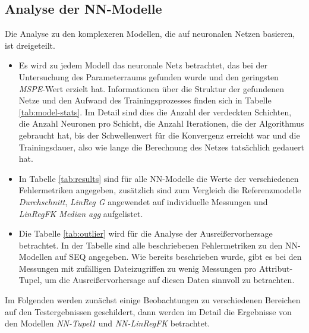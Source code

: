 \documentclass[
	12pt,
	a4paper,
	BCOR10mm,
	DIV14,
	listof=totoc,
	bibliography=totoc,
	headsepline
]{scrreprt}
\begin{document}
\subsection{Analyse der NN-Modelle}
Die Analyse zu den komplexeren Modellen, die auf neuronalen Netzen basieren, ist dreigeteilt. 
\begin{itemize}
	\item Es wird zu jedem Modell das neuronale Netz betrachtet, das bei der Untersuchung des Parameterraums gefunden wurde und den geringsten \textit{MSPE}-Wert erzielt hat.
Informationen über die Struktur der gefundenen Netze und den Aufwand des Trainingsprozesses finden sich in Tabelle \ref{tab:model-stats}. Im Detail sind dies die Anzahl der verdeckten Schichten, die Anzahl Neuronen pro Schicht, die Anzahl Iterationen, die der Algorithmus gebraucht hat, bis der Schwellenwert für die Konvergenz erreicht war und die Trainingsdauer, also wie lange die Berechnung des Netzes tatsächlich gedauert hat.
	\item In Tabelle \ref{tab:results} sind für alle NN-Modelle die Werte der verschiedenen Fehlermetriken angegeben, zusätzlich sind zum Vergleich die Referenzmodelle \textit{Durchschnitt}, \textit{LinReg G} angewendet auf individuelle Messungen und \textit{LinRegFK Median agg} aufgelistet.
	\item Die Tabelle \ref{tab:outlier} wird für die Analyse der Ausreißervorhersage betrachtet. In der Tabelle sind alle beschriebenen Fehlermetriken zu den NN-Modellen auf SEQ angegeben. Wie bereits beschrieben wurde, gibt es bei den Messungen mit zufälligen Dateizugriffen zu wenig Messungen pro Attribut-Tupel, um die Ausreißervorhersage auf diesen Daten sinnvoll zu betrachten.
\end{itemize}
Im Folgenden werden zunächst einige Beobachtungen zu verschiedenen Bereichen auf den Testergebnissen geschildert, dann werden im Detail die Ergebnisse von den Modellen \textit{NN-Tupel1} und \textit{NN-LinRegFK} betrachtet.
\end{document}
